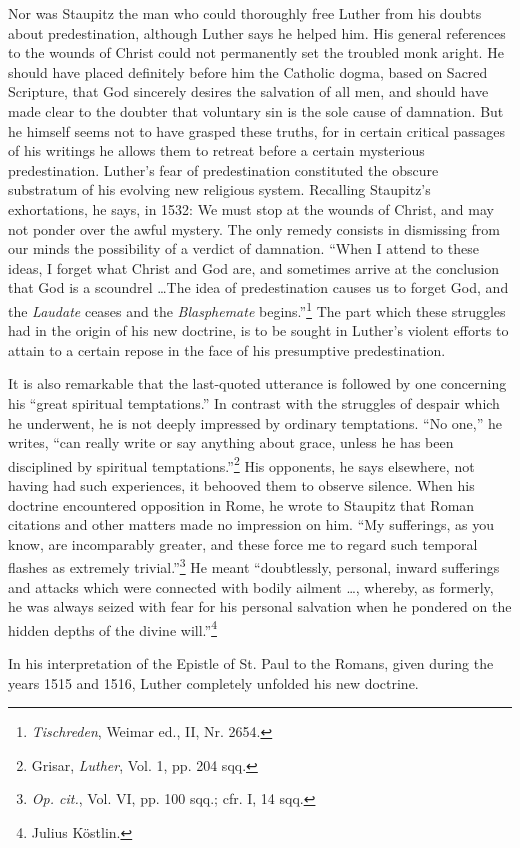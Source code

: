 Nor was Staupitz the man who could thoroughly free Luther from
his doubts about predestination, although Luther says he helped
him. His general references to the wounds of Christ could not permanently
set the troubled monk aright. He should have placed
definitely before him the Catholic dogma, based on Sacred Scripture,
that God sincerely desires the salvation of all men, and should have
made clear to the doubter that voluntary sin is the sole cause
of damnation. But he himself seems not to have grasped these truths,
for in certain critical passages of his writings he allows them to retreat
before a certain mysterious predestination. Luther’s fear of predestination
constituted the obscure substratum of his evolving new
religious system. Recalling Staupitz’s exhortations, he says, in 1532:
We must stop at the wounds of Christ, and may not ponder over
the awful mystery. The only remedy consists in dismissing from our
minds the possibility of a verdict of damnation. “When I attend
to these ideas, I forget what Christ and God are, and sometimes arrive
at the conclusion that God is a scoundrel \dots The idea of
predestination causes us to forget God, and the \textit{Laudate} ceases and
the \textit{Blasphemate} begins.”\footnote{\textit{Tischreden}, Weimar ed., II, Nr. 2654.}
The part which these struggles had in the
origin of his new doctrine, is to be sought in Luther’s violent efforts
to attain to a certain repose in the face of his presumptive predestination.

It is also remarkable that the last-quoted utterance is followed by
one concerning his “great spiritual temptations.” In contrast with
the struggles of despair which he underwent, he is not deeply impressed
by ordinary temptations. “No one,” he writes, “can really
write or say anything about grace, unless he has been disciplined by
spiritual temptations.”\footnote{Grisar, \textit{Luther}, Vol. 1, pp. 204 sqq.}
His opponents, he says elsewhere, not
having had such experiences, it behooved them to observe silence.
When his doctrine encountered opposition in Rome, he wrote to
Staupitz that Roman citations and other matters made no impression
on him. “My sufferings, as you know, are incomparably greater,
and these force me to regard such temporal flashes as extremely
trivial.”\footnote{\textit{Op. cit.}, Vol. VI, pp. 100 sqq.; cfr. I, 14 sqq.}
He meant “doubtlessly, personal, inward sufferings and
attacks which were connected with bodily ailment \dots, whereby,
as formerly, he was always seized with fear for his personal salvation
when he pondered on the hidden depths of the divine will.”\footnote{Julius Köstlin.}

In his interpretation of the Epistle of St. Paul to the Romans,
given during the years 1515 and 1516, Luther completely unfolded
his new doctrine.
